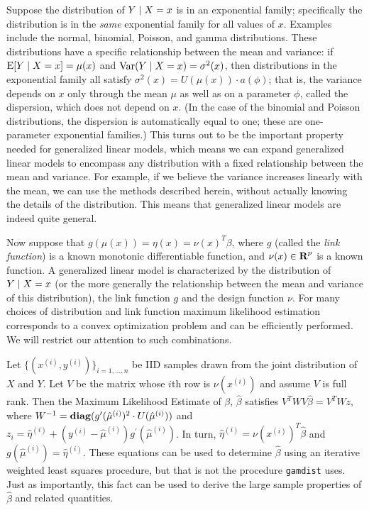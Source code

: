\documentclass[12pt]{article}
\newcommand{\gamdist}{\texttt{gamdist}}
\DeclareMathOperator{\Exp}{\operatorname{E}}
\DeclareMathOperator{\Var}{\operatorname{Var}}
\begin{document}
Suppose the distribution of $Y \; | \; X = x$ is in an exponential family; specifically the distribution is in the \emph{same} exponential family for all values of $x$. Examples include the normal, binomial, Poisson, and gamma distributions. These distributions have a specific relationship between the mean and variance: if $\Exp [Y \given X = x] = \mu(x)$ and $\Var(Y \given X = x) = \sigma^2 (x)$, then distributions in the exponential family all satisfy $\sigma^2(x) = U(\mu(x)) \cdot a(\phi)$; that is, the variance depends on $x$ only through the mean $\mu$ as well as on a parameter $\phi$, called the dispersion, which does not depend on $x$. (In the case of the binomial and Poisson distributions, the dispersion is automatically equal to one; these are one-parameter exponential families.) This turns out to be the important property needed for generalized linear models, which means we can expand generalized linear models to encompass any distribution with a fixed relationship between the mean and variance. For example, if we believe the variance increases linearly with the mean, we can use the methods described herein, without actually knowing the details of the distribution. This means that generalized linear models are indeed quite general.

Now suppose that $g(\mu(x)) = \eta(x) = \nu(x)^T \beta$, where $g$ (called the \emph{link function}) is a known monotonic differentiable function, and $\nu(x) \in {\mbox{\bf R}}^p$ is a known function. A generalized linear model is characterized by the distribution of $Y \; | \; X = x$ (or the more generally the relationship between the mean and variance of this distribution), the link function $g$ and the design function $\nu$. For many choices of distribution and link function maximum likelihood estimation corresponds to a convex optimization problem and can be efficiently performed. We will restrict our attention to such combinations.

Let $\{ (x^{(i)}, y^{(i)}) \}_{i=1, \ldots, n}$ be IID samples drawn from the joint distribution of $X$ and $Y$. Let $V$ be the matrix whose $i$th row is $\nu(x^{(i)})$ and assume $V$ is full rank. Then the Maximum Likelihood Estimate of $\beta$, $\hat{\beta}$ satisfies $V^T W V \hat{\beta} = V^T W z$, where $W^{-1} = \mathop{\bf diag}(g^\prime(\hat{\mu}^{(i)})^2 \cdot U(\hat{\mu}^{(i)}))$ and $z_i = \hat{\eta}^{(i)} + (y^{(i)} - \hat{\mu}^{(i)}) g^\prime(\hat{\mu}^{(i)})$. In turn, $\hat{\eta}^{(i)} = \nu(x^{(i)})^T \hat{\beta}$ and $g(\hat{\mu}^{(i)}) = \hat{\eta}^{(i)}$. These equations can be used to determine $\hat{\beta}$ using an iterative weighted least squares procedure, but that is not the procedure \gamdist{} uses. Just as importantly, this fact can be used to derive the large sample properties of $\hat{\beta}$ and related quantities.
\end{document}
